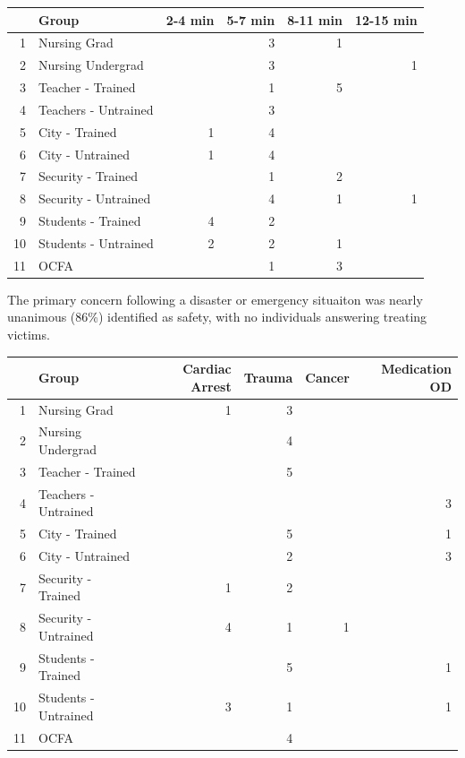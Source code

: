 \documentclass{article}
\begin{document}
\begin{table}[ht]
\centering
\begin{tabular}{rlrrrr}
  \hline
 & Group & 2-4 min & 5-7 min & 8-11 min & 12-15 min \\ 
  \hline
1 & Nursing Grad &  &   3 &   1 &  \\ 
  2 & Nursing Undergrad &  &   3 &  &   1 \\ 
  3 & Teacher - Trained &  &   1 &   5 &  \\ 
  4 & Teachers - Untrained &  &   3 &  &  \\ 
  5 & City - Trained &   1 &   4 &  &  \\ 
  6 & City - Untrained &   1 &   4 &  &  \\ 
  7 & Security - Trained &  &   1 &   2 &  \\ 
  8 & Security - Untrained &  &   4 &   1 &   1 \\ 
  9 & Students - Trained &   4 &   2 &  &  \\ 
  10 & Students - Untrained &   2 &   2 &   1 &  \\ 
  11 & OCFA &  &   1 &   3 &  \\ 
   \hline
\end{tabular}
\end{table}

\pagebreak
The primary concern following a disaster or emergency situaiton was nearly unanimous (86\%)
identified as safety, with no individuals answering treating victims.

\begin{table}[ht]
\centering
\begin{tabular}{rlrrrr}
  \hline
 & Group & Cardiac Arrest & Trauma & Cancer & Medication OD \\
  \hline
1 & Nursing Grad &   1 &   3 &  &  \\
  2 & Nursing Undergrad &  &   4 &  &  \\
  3 & Teacher - Trained &  &   5 &  &  \\
  4 & Teachers - Untrained &  &  &  &   3 \\
  5 & City - Trained &  &   5 &  &   1 \\
  6 & City - Untrained &  &   2 &  &   3 \\
  7 & Security - Trained &   1 &   2 &  &  \\
  8 & Security - Untrained &   4 &   1 &   1 &  \\
  9 & Students - Trained &  &   5 &  &   1 \\
  10 & Students - Untrained &   3 &   1 &  &   1 \\
  11 & OCFA &  &   4 &  &  \\
   \hline
\end{tabular}
\end{table}
\end{document}
